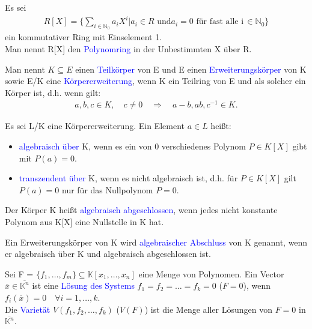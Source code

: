 \begin{definition}
Es sei 
\begin{align*}
R[X] = \{\sum_{i\in\mathbb{N}_0} a_i X^i |a_i \in R \text{ und} a_i = 0 \text{ für fast alle i} \,\in \mathbb{N}_0 \}
\end{align*}
ein kommutativer Ring mit Einselement 1. \\
Man nennt R[X] den \textcolor{blue}{Polynomring} in der Unbestimmten X über R. \cite{Karpfinger}
\end{definition}

\begin{definition}
Man nennt $K \subseteq E$ einen \textcolor{blue}{Teilkörper} von E und E einen \textcolor{blue}{Erweiterungskörper} von K sowie E/K eine \textcolor{blue}{Körpererweiterung}, wenn K ein Teilring von E und als solcher ein Körper ist, d.h. wenn gilt\cite{Karpfinger}:
\begin{align*}
a, b, c\in K, \quad c \neq 0 \quad \Rightarrow \quad a-b,ab,c^{-1}\in K. 
\end{align*} 
\end{definition}

\begin{definition}
Es sei L/K eine Körpererweiterung. Ein Element $a \in L$ heißt:
\begin{itemize}
\item \textcolor{blue}{algebraisch über} K, wenn es ein von 0 verschiedenes Polynom $P \in K[X]$ gibt mit $P(a) = 0$.
\item \textcolor{blue}{transzendent über} K, wenn es nicht algebraisch ist, d.h. für $P \in K[X]$ gilt $P(a) = 0$ nur für das Nullpolynom $P = 0$. \cite{Karpfinger}  
\end{itemize} 
\end{definition}

\begin{definition}
Der Körper K heißt \textcolor{blue}{algebraisch abgeschlossen}, wenn jedes nicht konstante Polynom aus K[X] eine Nullstelle in K hat. \cite{Karpfinger}
\end{definition}

\begin{definition}
Ein Erweiterungskörper von K wird \textcolor{blue}{algebraischer Abschluss} von K genannt, wenn er algebraisch über K und algebraisch abgeschlossen ist. \cite{Karpfinger}
\end{definition}

\begin{definition}
Sei F = $\{f_1,\ldots,f_m\} \subseteq \mathbb{K}[x_1,\ldots,x_n]$ eine Menge von Polynomen. Ein Vector $\overline{x} \in \overline{\mathbb{K}^n}$ ist eine \textcolor{blue}{Lösung des Systems} $f_1 = f_2 = \ldots = f_k=0$ ($F = 0$), wenn $f_i(\overline{x})=0 \quad \forall i=1,\dots,k$.\\
Die \textcolor{blue}{Varietät} $V(f_1,f_2,\ldots,f_k)$ ($V(F)$) ist die Menge aller Lösungen von $F=0$ in $\overline{\mathbb{K}^n}$.\cite{Ausgangsartikel}
\end{definition}

